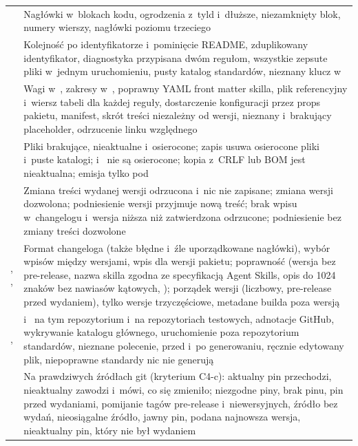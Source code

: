 \begin{xltabular}{\linewidth}{@{}>{\raggedright\arraybackslash}p{5.1cm} >{\raggedright\arraybackslash}X@{}}
 & Nagłówki w~blokach kodu, ogrodzenia z~tyld i~dłuższe, niezamknięty blok, numery wierszy, nagłówki poziomu trzeciego \\
 & Kolejność po identyfikatorze i~pominięcie README, zduplikowany identyfikator, diagnostyka przypisana dwóm regułom, wszystkie zepsute pliki w~jednym uruchomieniu, pusty katalog standardów, nieznany klucz w~ \\
 & Wagi w~, zakresy w~, poprawny YAML front matter skilla, plik referencyjny i~wiersz tabeli dla każdej reguły, dostarczenie konfiguracji przez props pakietu, manifest, skrót treści niezależny od wersji, nieznany i~brakujący placeholder, odrzucenie linku względnego \\
 & Pliki brakujące, nieaktualne i~osierocone; zapis usuwa osierocone pliki i~puste katalogi;  i~ nie są osierocone; kopia z~CRLF lub BOM jest nieaktualna; emisja tylko pod  \\
 & Zmiana treści wydanej wersji odrzucona i~nic nie zapisane; zmiana wersji  dozwolona; podniesienie wersji przyjmuje nową treść; brak wpisu w~changelogu i~wersja niższa niż zatwierdzona odrzucone; podniesienie bez zmiany treści dozwolone \\
, ,  & Format changeloga (także błędne i~źle uporządkowane nagłówki), wybór wpisów między wersjami, wpis dla wersji pakietu; poprawność  (wersja bez pre-release, nazwa skilla zgodna ze specyfikacją Agent Skills, opis do 1024 znaków bez nawiasów kątowych, ); porządek wersji (liczbowy, pre-release przed wydaniem), tylko wersje trzyczęściowe, metadane builda poza wersją \\
,  &  i~ na tym repozytorium i~na repozytoriach testowych, adnotacje GitHub, wykrywanie katalogu głównego, uruchomienie poza repozytorium standardów, nieznane polecenie,  przed i~po generowaniu, ręcznie edytowany plik, niepoprawne standardy nic nie generują \\
 & Na prawdziwych źródłach git (kryterium C4-c): aktualny pin przechodzi, nieaktualny zawodzi i~mówi, co się zmieniło; niezgodne piny, brak pinu, pin przed wydaniami, pomijanie tagów pre-release i~niewersyjnych, źródło bez wydań, nieosiągalne źródło, jawny pin, podana najnowsza wersja, nieaktualny pin, który nie był wydaniem \\

\end{xltabular}
